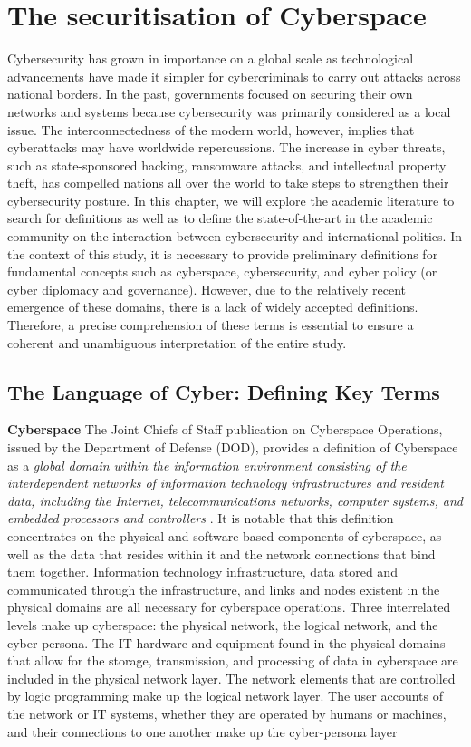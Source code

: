 \chapter{The securitisation of Cyberspace}


Cybersecurity has grown in importance on a global scale as technological advancements have made it simpler for cybercriminals to carry out attacks across national borders. In the past, governments focused on securing their own networks and systems because cybersecurity was primarily considered as a local issue. The interconnectedness of the modern world, however, implies that cyberattacks may have worldwide repercussions. The increase in cyber threats, such as state-sponsored hacking, ransomware attacks, and intellectual property theft, has compelled nations all over the world to take steps to strengthen their cybersecurity posture. 
In this chapter, we will explore the academic literature to search for definitions as well as to define the state-of-the-art in the academic community on the interaction between cybersecurity and international politics. In the context of this study, it is necessary to provide preliminary definitions for fundamental concepts such as cyberspace, cybersecurity, and cyber policy (or cyber diplomacy and governance). However, due to the relatively recent emergence of these domains, there is a lack of widely accepted definitions. Therefore, a precise comprehension of these terms is essential to ensure a coherent and unambiguous interpretation of the entire study. 

\section{The Language of Cyber: Defining Key Terms}


\textbf{Cyberspace} The Joint Chiefs of Staff publication on Cyberspace Operations, issued by the Department of Defense (DOD), provides a definition of Cyberspace as a \textit{global domain within the information environment consisting of the interdependent networks of information technology infrastructures and resident data, including the Internet, telecommunications networks, computer systems, and embedded processors and controllers} \autocite[GL-4]{jointchiefsofstaff_2018_cyberspace}. It is notable that this definition concentrates on the physical and software-based components of cyberspace, as well as the data that resides within it and the network connections that bind them together. Information technology infrastructure, data stored and communicated through the infrastructure, and links and nodes existent in the physical domains are all necessary for cyberspace operations. Three interrelated levels make up cyberspace: the physical network, the logical network, and the cyber-persona. The IT hardware and equipment found in the physical domains that allow for the storage, transmission, and processing of data in cyberspace are included in the physical network layer. The network elements that are controlled by logic programming make up the logical network layer. The user accounts of the network or IT systems, whether they are operated by humans or machines, and their connections to one another make up the cyber-persona layer \autocite{jointchiefsofstaff_2018_cyberspace}

